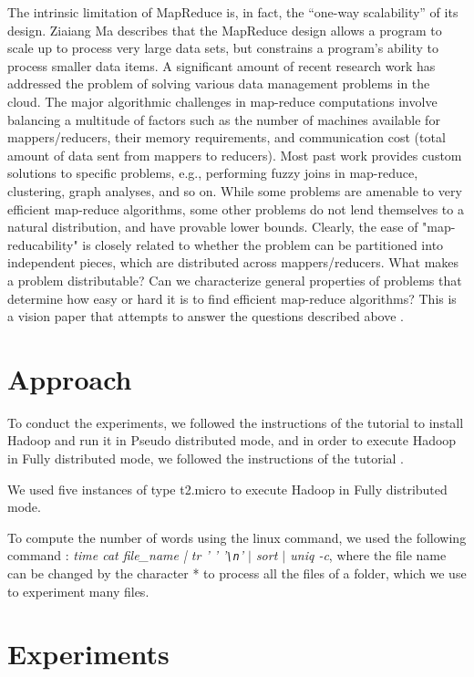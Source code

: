 \documentclass[10pt, conference]{IEEEtran}
\newcommand*{\escape}[1]{\texttt{\textbackslash#1}}
\begin{document}
The intrinsic limitation of MapReduce is, in fact, the “one-way scalability” of its design. Ziaiang Ma \cite{ma2010limitation} describes that the MapReduce design allows a program to scale up to process very large data sets, but constrains a program’s ability to process smaller data items. A significant amount of recent research work has addressed the problem of solving various data management problems in the cloud. The major algorithmic challenges in map-reduce computations involve balancing a multitude of factors such as the number of machines available for mappers/reducers, their memory requirements, and communication cost (total amount of data sent from mappers to reducers). Most past work provides custom solutions to specific problems, e.g., performing fuzzy joins in map-reduce, clustering, graph analyses, and so on. While some problems are amenable to very efficient map-reduce algorithms, some other problems do not lend themselves to a natural distribution, and have provable lower bounds. Clearly, the ease of "map-reducability" is closely related to whether the problem can be partitioned into independent pieces, which are distributed across mappers/reducers. What makes a problem distributable? Can we characterize general properties of problems that determine how easy or hard it is to find efficient map-reduce algorithms? This is a vision paper that attempts to answer the questions described above \cite{afrati2012vision}.



\section{Approach}
\label{sec:approach}
To conduct the experiments, we followed the instructions of the tutorial \cite{tutorial} to install Hadoop and run it in Pseudo distributed mode, and in order to execute Hadoop in Fully distributed mode, we followed the instructions of the tutorial \cite{tutorial2}.

We used five instances of type t2.micro to execute Hadoop in Fully distributed mode. 

To compute the number of words using the linux command, we used the following command : \textit{time cat file\_name | tr ' ' '\escape{n}' $|$ sort $|$ uniq -c}, where the file name can be changed by the character * to process all the files of a folder, which we use to experiment many files.

\section{Experiments}
\label{sec:experiments}
\end{document}
